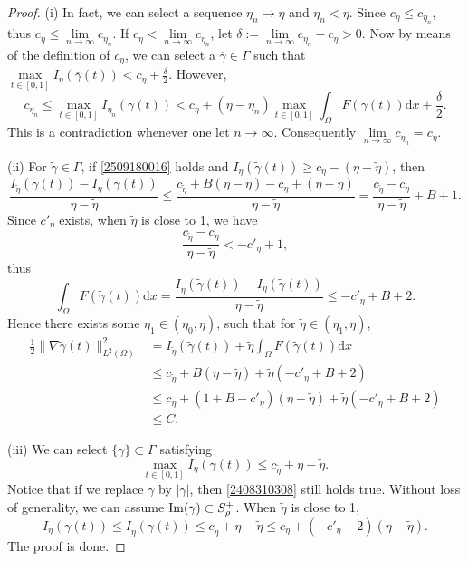 \documentclass[10pt]{article}
\numberwithin{equation}{section}
\newcommand{\ud}{\mathrm{d}}
\numberwithin{equation}{section}
\begin{document}
\begin{proof}
{\rm (i)} In fact, we can select a sequence $\eta_n\to\eta$ and $\eta_n<\eta$. Since $c_\eta\le {c}_{\eta_n}$, thus $c_\eta\le \lim\limits_{n\to\infty}{c}_{\eta_n}$. If $c_\eta<\lim\limits_{n\to\infty}{c}_{\eta_n}$, let $\delta:=\lim\limits_{n\to\infty}{c}_{\eta_n}-c_\eta>0$. Now by means of the definition of $c_\eta$, we can select a $\overline{\gamma}\in \Gamma$ such that $\underset{t\in [0, 1]}{\max}I_\eta(\overline{\gamma}(t))<c_\eta+\frac{\delta}{2}$. However,
\[
c_{\eta_n}\le \max_{t\in [0, 1]}I_{\eta_n}(\overline{\gamma}(t))<c_\eta
+(\eta-\eta_n)\max_{t\in [0, 1]}\int_\Omega F(\overline{\gamma}(t))\ud x+\frac{\delta}{2}.
\]
This is a contradiction whenever one let $n\to \infty$. Consequently $\lim\limits_{n\to\infty}{c}_{\eta_n}=c_\eta$.

{\rm (ii)} For $\widetilde{\gamma}\in \Gamma$, if \eqref{2509180016} holds and $I_{\eta}(\widetilde{\gamma}(t))\ge c_{\eta}-(\eta-\widetilde{\eta})$, then
\[
\frac{I_{\widetilde{\eta}}(\widetilde{\gamma}(t))-I_{\eta}(\widetilde{\gamma}(t))}{\eta-\widetilde{\eta}}\le \frac{c_{\widetilde{\eta}}+B(\eta-\widetilde{\eta})-c_{\eta}+(\eta-\widetilde{\eta})}{\eta-\widetilde{\eta}}=\frac{c_{\widetilde{\eta}}-c_{\eta}}{\eta-\widetilde{\eta}}+B+1.
\]
Since $c'_{\eta}$ exists, when $\widetilde{\eta}$ is close to 1, we have
\[
\frac{c_{\widetilde{\eta}}-c_{\eta}}{\eta-\widetilde{\eta}}<-c'_\eta+1,
\]
thus
\[
\int_{\Omega}F(\widetilde{\gamma}(t)) \ud x=\frac{I_{\widetilde{\eta}}(\widetilde{\gamma}(t))-I_{\eta}(\widetilde{\gamma}(t))}{\eta-\widetilde{\eta}}\le -c'_{\eta}+B+2.
\]
Hence there exists some $\eta_1\in (\eta_0, \eta)$, such that for $\widetilde{\eta}\in (\eta_1, \eta)$,
\[
\begin{aligned}
\frac12\|\nabla \widetilde{\gamma}(t)\|_{L^2(\Omega)}^2&=I_{\widetilde{\eta}}(\widetilde{\gamma}(t))
+\widetilde{\eta}\int_{\Omega}F(\widetilde{\gamma}(t)) \ud x\\
&\le c_{\widetilde{\eta}}+B(\eta-\widetilde{\eta})+\widetilde{\eta}(-c'_{\eta}+B+2)\\
&\le c_{\eta}+(1+B-c'_\eta)(\eta-\widetilde{\eta})+\widetilde{\eta}(-c'_{\eta}+B+2)\\
&\le C.
\end{aligned}
\]

{\rm (iii)} We can select $\{\gamma\}\subset \Gamma$ satisfying
\begin{equation}\label{2408310308}
\underset{t\in [0, 1]}{\max}I_{\eta}(\gamma(t))\le c_{\widetilde{\eta}}+\eta-\widetilde{\eta}.
\end{equation}
Notice that if we replace $\gamma$ by $|\gamma|$, then \eqref{2408310308} still holds true. Without loss of generality, we can assume ${\rm Im}(\gamma)\subset S^+_\rho$. When $\widetilde{\eta}$ is close to 1,
\[
I_{\eta}(\gamma(t))\le I_{\widetilde{\eta}}(\gamma(t))\le c_{\widetilde{\eta}}+\eta-\widetilde{\eta}\le c_{\eta}+(-c'_{\eta}+2)(\eta-\widetilde{\eta}).
\]
The proof is done.
\end{proof}
\end{document}
